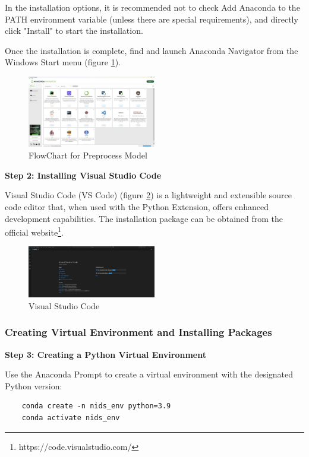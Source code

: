 \begin{ZhChapter}
    In the installation options, it is recommended not to check Add Anaconda to the PATH environment variable (unless there are special requirements), and directly click "Install" to start the installation.

    Once the installation is complete, find and launch Anaconda Navigator from the Windows Start menu (figure \ref{fig: AnacondaMenu}).
    \begin{figure}[htbp]
        \centering
        \includegraphics[width = 0.5\textwidth]{image/AnacondaMenu.jpg}
        \caption{FlowChart for Preprocess Model}
        \label{fig: AnacondaMenu}
    \end{figure}




    \textbf{Step 2: Installing Visual Studio Code}

    Visual Studio Code (VS Code) (figure \ref{fig: VS}) is a lightweight and extensible source code editor that, when used with the Python Extension, offers enhanced development capabilities. The installation package can be obtained from the official website\footnote{https://code.visualstudio.com/}.

    \begin{figure}[htbp]
        \centering
        \includegraphics[width = 0.5\textwidth]{image/VS.jpg}
        \caption{Visual Studio Code}
        \label{fig: VS}
    \end{figure}

    \subsubsection{Creating Virtual Environment and Installing Packages}

    \textbf{Step 3: Creating a Python Virtual Environment}

    Use the Anaconda Prompt to create a virtual environment with the designated Python version:
    \begin{verbatim}
    conda create -n nids_env python=3.9
    conda activate nids_env
    \end{verbatim}


\end{ZhChapter}
